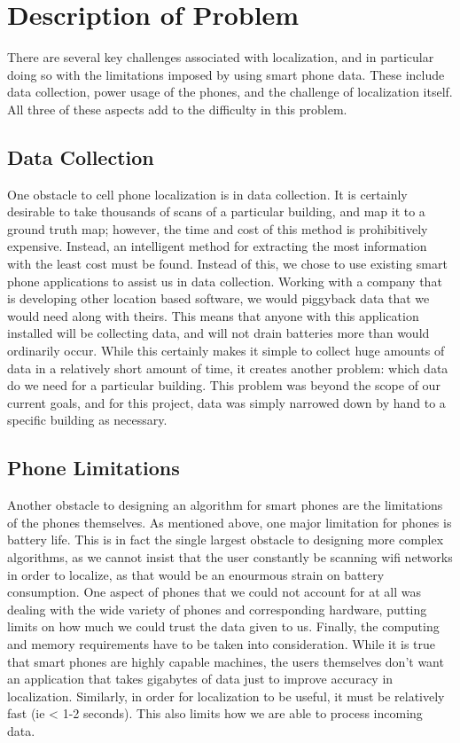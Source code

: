 \section{Description of Problem}

There are several key challenges associated with localization, and 
in particular doing so with the limitations imposed by using smart
phone data. These include data collection, power usage of the phones,
and the challenge of localization itself.  All three of these aspects
add to the difficulty in this problem. 

\subsection{Data Collection}
One obstacle to cell phone localization is in data collection.  
It is certainly desirable to take thousands of scans of a particular
building, and map it to a ground truth map; however, the time and 
cost of this method is prohibitively expensive.  Instead, an intelligent
method for extracting the most information with the least cost must be 
found.  Instead of this, we chose to use existing smart phone applications
to assist us in data collection.  Working with a company that is 
developing other location based software, we would piggyback data
that we would need along with theirs.  This means that anyone with 
this application installed will be collecting data, and will not
drain batteries more than would ordinarily occur.  While this certainly
makes it simple to collect huge amounts of data in a relatively short amount
of time, it creates another problem: which data do we need for a particular building.
This problem was beyond the scope of our current goals, and for this 
project, data was simply narrowed down by hand to a specific building as 
necessary.  

\subsection{Phone Limitations}
Another obstacle to designing an algorithm for smart phones are the limitations
of the phones themselves.  As mentioned above, one major limitation 
for phones is battery life.  This is in fact the single largest obstacle
to designing more complex algorithms, as we cannot insist that the user constantly 
be scanning wifi networks in order to localize, as that would be an enourmous strain 
on battery consumption.  One aspect of phones that we could not account for at all
was dealing with the wide variety of phones and corresponding hardware, putting 
limits on how much we could trust the data given to us. Finally, the computing and 
memory requirements have to be taken into consideration.  While it is true that 
smart phones are highly capable machines, the users themselves don't want an
application that takes gigabytes of data just to improve accuracy in localization.
Similarly, in order for localization to be useful, it must be relatively fast 
(ie < 1-2 seconds).  This also limits how we are able to process incoming data.

